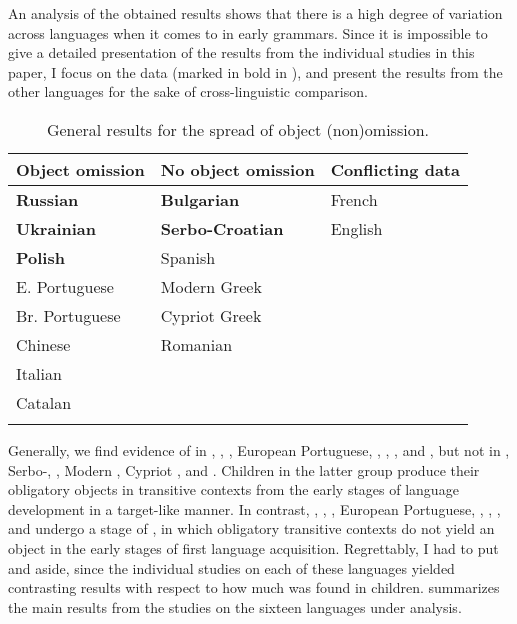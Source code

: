 \documentclass[output=paper,modfonts,newtxmath,hidelinks,]{langscibook}
\begin{document}
An analysis of the obtained results shows that there is a high degree of variation across languages when it comes to  in early grammars. Since it is impossible to give a detailed presentation of the results from the individual studies in this paper, I focus on the  data (marked in bold in ), and present the results from the other languages for the sake of cross-linguistic comparison.\largerpage[2]

\begin{table}[h]
    \caption{General results for the spread of object (non)omission.}
\begin{center}
    \begin{tabularx}{0.85\linewidth}{XXX}
    \lsptoprule
     \textbf{Object omission} & \textbf{No object omission} & \textbf{Conflicting data}\\ \midrule
    \textbf{Russian} & \textbf{Bulgarian} & {French} \\ 
    \textbf{Ukrainian} & \textbf{Serbo-Croatian} & {English} \\ 
    \textbf{Polish} & {Spanish} &  \\ 
    E. Portuguese & Modern {Greek} & \\ 
    Br. Portuguese & Cypriot {Greek} & \\ 
    {Chinese} & {Romanian} & \\ 
    {Italian} & & \\ 
    {Catalan} & & \\ \lspbottomrule
    \end{tabularx}
\end{center}
\label{17:table:table_2}
\end{table}

Generally, we find evidence of  in , , , European Portuguese, , , , and , but not in , Serbo-, , Modern , Cypriot , and . Children in the latter group produce their obligatory objects in transitive contexts from the early stages of language development in a target-like manner. In contrast, , , , European Portuguese, , , , and  undergo a stage of , in which obligatory transitive contexts do not yield an object in the early stages of first language acquisition. Regrettably, I had to put  and  aside, since the individual studies on each of these languages yielded contrasting results with respect to how much  was found in children.  summarizes the main results from the studies on the sixteen languages under analysis.\largerpage
\end{document}
